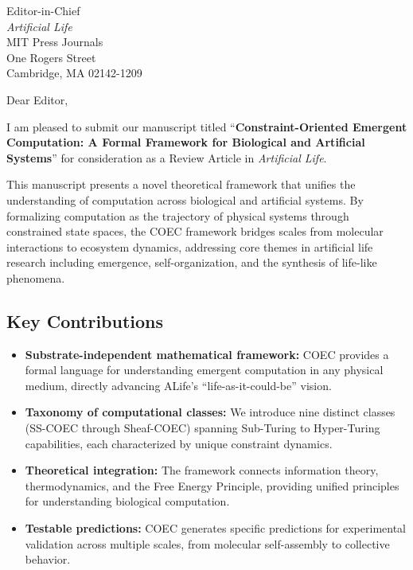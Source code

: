 \documentclass[11pt]{letter}
\begin{document}
\begin{letter}{%
Editor-in-Chief\\
\textit{Artificial Life}\\
MIT Press Journals\\
One Rogers Street\\
Cambridge, MA 02142-1209
}

\opening{Dear Editor,}

I am pleased to submit our manuscript titled ``\textbf{Constraint-Oriented Emergent Computation: A Formal Framework for Biological and Artificial Systems}'' for consideration as a Review Article in \textit{Artificial Life}.

This manuscript presents a novel theoretical framework that unifies the understanding of computation across biological and artificial systems. By formalizing computation as the trajectory of physical systems through constrained state spaces, the COEC framework bridges scales from molecular interactions to ecosystem dynamics, addressing core themes in artificial life research including emergence, self-organization, and the synthesis of life-like phenomena.

\subsection*{Key Contributions}

\begin{itemize}
    \item \textbf{Substrate-independent mathematical framework:} COEC provides a formal language for understanding emergent computation in any physical medium, directly advancing ALife's ``life-as-it-could-be'' vision.

    \item \textbf{Taxonomy of computational classes:} We introduce nine distinct classes (SS-COEC through Sheaf-COEC) spanning Sub-Turing to Hyper-Turing capabilities, each characterized by unique constraint dynamics.

    \item \textbf{Theoretical integration:} The framework connects information theory, thermodynamics, and the Free Energy Principle, providing unified principles for understanding biological computation.

    \item \textbf{Testable predictions:} COEC generates specific predictions for experimental validation across multiple scales, from molecular self-assembly to collective behavior.


\end{itemize}
\end{letter}
\end{document}
